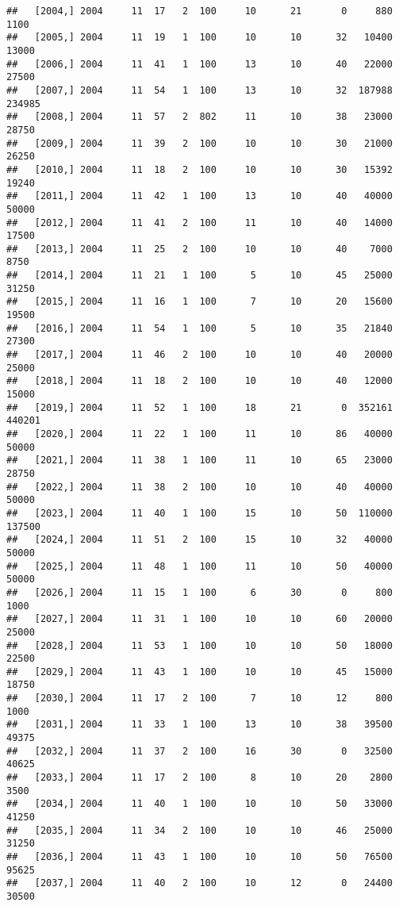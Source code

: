 \documentclass{article}\usepackage[]{graphicx}\usepackage[]{color}
\makeatletter
\newenvironment{kframe}{%
 \def\at@end@of@kframe{}%
 \ifinner\ifhmode%
  \def\at@end@of@kframe{\end{minipage}}%
  \begin{minipage}{\columnwidth}%
 \fi\fi%
 \def\FrameCommand##1{\hskip\@totalleftmargin \hskip-\fboxsep
 \colorbox{shadecolor}{##1}\hskip-\fboxsep
     \hskip-\linewidth \hskip-\@totalleftmargin \hskip\columnwidth}%
 \MakeFramed {\advance\hsize-\width
   \@totalleftmargin\z@ \linewidth\hsize
   \@setminipage}}%
 {\par\unskip\endMakeFramed%
 \at@end@of@kframe}
\newenvironment{knitrout}{}{} %
\makeatother
\begin{document}
\begin{knitrout}
\begin{kframe}
\begin{verbatim}
##   [2004,] 2004     11  17   2  100     10      21       0     880    1100
##   [2005,] 2004     11  19   1  100     10      10      32   10400   13000
##   [2006,] 2004     11  41   1  100     13      10      40   22000   27500
##   [2007,] 2004     11  54   1  100     13      10      32  187988  234985
##   [2008,] 2004     11  57   2  802     11      10      38   23000   28750
##   [2009,] 2004     11  39   2  100     10      10      30   21000   26250
##   [2010,] 2004     11  18   2  100     10      10      30   15392   19240
##   [2011,] 2004     11  42   1  100     13      10      40   40000   50000
##   [2012,] 2004     11  41   2  100     11      10      40   14000   17500
##   [2013,] 2004     11  25   2  100     10      10      40    7000    8750
##   [2014,] 2004     11  21   1  100      5      10      45   25000   31250
##   [2015,] 2004     11  16   1  100      7      10      20   15600   19500
##   [2016,] 2004     11  54   1  100      5      10      35   21840   27300
##   [2017,] 2004     11  46   2  100     10      10      40   20000   25000
##   [2018,] 2004     11  18   2  100     10      10      40   12000   15000
##   [2019,] 2004     11  52   1  100     18      21       0  352161  440201
##   [2020,] 2004     11  22   1  100     11      10      86   40000   50000
##   [2021,] 2004     11  38   1  100     11      10      65   23000   28750
##   [2022,] 2004     11  38   2  100     10      10      40   40000   50000
##   [2023,] 2004     11  40   1  100     15      10      50  110000  137500
##   [2024,] 2004     11  51   2  100     15      10      32   40000   50000
##   [2025,] 2004     11  48   1  100     11      10      50   40000   50000
##   [2026,] 2004     11  15   1  100      6      30       0     800    1000
##   [2027,] 2004     11  31   1  100     10      10      60   20000   25000
##   [2028,] 2004     11  53   1  100     10      10      50   18000   22500
##   [2029,] 2004     11  43   1  100     10      10      45   15000   18750
##   [2030,] 2004     11  17   2  100      7      10      12     800    1000
##   [2031,] 2004     11  33   1  100     13      10      38   39500   49375
##   [2032,] 2004     11  37   2  100     16      30       0   32500   40625
##   [2033,] 2004     11  17   2  100      8      10      20    2800    3500
##   [2034,] 2004     11  40   1  100     10      10      50   33000   41250
##   [2035,] 2004     11  34   2  100     10      10      46   25000   31250
##   [2036,] 2004     11  43   1  100     10      10      50   76500   95625
##   [2037,] 2004     11  40   2  100     10      12       0   24400   30500

\end{verbatim}
\end{kframe}
\end{knitrout}
\end{document}
